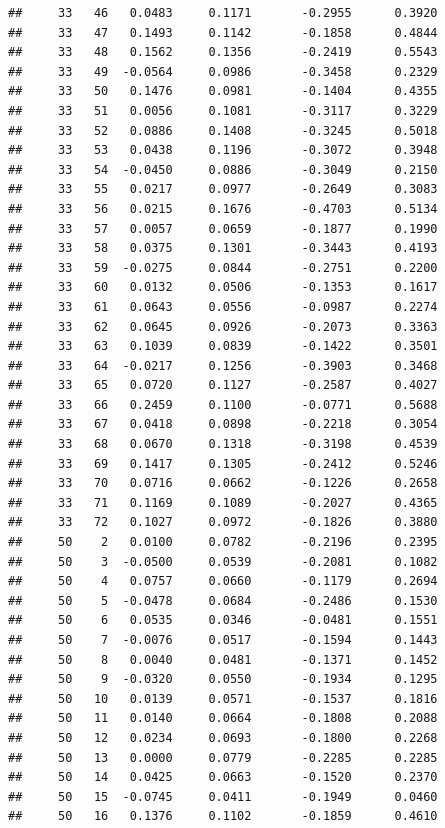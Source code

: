 \documentclass[
]{article}
\begin{document}
\begin{verbatim}
##     33   46   0.0483     0.1171       -0.2955      0.3920  
##     33   47   0.1493     0.1142       -0.1858      0.4844  
##     33   48   0.1562     0.1356       -0.2419      0.5543  
##     33   49  -0.0564     0.0986       -0.3458      0.2329  
##     33   50   0.1476     0.0981       -0.1404      0.4355  
##     33   51   0.0056     0.1081       -0.3117      0.3229  
##     33   52   0.0886     0.1408       -0.3245      0.5018  
##     33   53   0.0438     0.1196       -0.3072      0.3948  
##     33   54  -0.0450     0.0886       -0.3049      0.2150  
##     33   55   0.0217     0.0977       -0.2649      0.3083  
##     33   56   0.0215     0.1676       -0.4703      0.5134  
##     33   57   0.0057     0.0659       -0.1877      0.1990  
##     33   58   0.0375     0.1301       -0.3443      0.4193  
##     33   59  -0.0275     0.0844       -0.2751      0.2200  
##     33   60   0.0132     0.0506       -0.1353      0.1617  
##     33   61   0.0643     0.0556       -0.0987      0.2274  
##     33   62   0.0645     0.0926       -0.2073      0.3363  
##     33   63   0.1039     0.0839       -0.1422      0.3501  
##     33   64  -0.0217     0.1256       -0.3903      0.3468  
##     33   65   0.0720     0.1127       -0.2587      0.4027  
##     33   66   0.2459     0.1100       -0.0771      0.5688  
##     33   67   0.0418     0.0898       -0.2218      0.3054  
##     33   68   0.0670     0.1318       -0.3198      0.4539  
##     33   69   0.1417     0.1305       -0.2412      0.5246  
##     33   70   0.0716     0.0662       -0.1226      0.2658  
##     33   71   0.1169     0.1089       -0.2027      0.4365  
##     33   72   0.1027     0.0972       -0.1826      0.3880  
##     50    2   0.0100     0.0782       -0.2196      0.2395  
##     50    3  -0.0500     0.0539       -0.2081      0.1082  
##     50    4   0.0757     0.0660       -0.1179      0.2694  
##     50    5  -0.0478     0.0684       -0.2486      0.1530  
##     50    6   0.0535     0.0346       -0.0481      0.1551  
##     50    7  -0.0076     0.0517       -0.1594      0.1443  
##     50    8   0.0040     0.0481       -0.1371      0.1452  
##     50    9  -0.0320     0.0550       -0.1934      0.1295  
##     50   10   0.0139     0.0571       -0.1537      0.1816  
##     50   11   0.0140     0.0664       -0.1808      0.2088  
##     50   12   0.0234     0.0693       -0.1800      0.2268  
##     50   13   0.0000     0.0779       -0.2285      0.2285  
##     50   14   0.0425     0.0663       -0.1520      0.2370  
##     50   15  -0.0745     0.0411       -0.1949      0.0460  
##     50   16   0.1376     0.1102       -0.1859      0.4610  

\end{verbatim}
\end{document}
